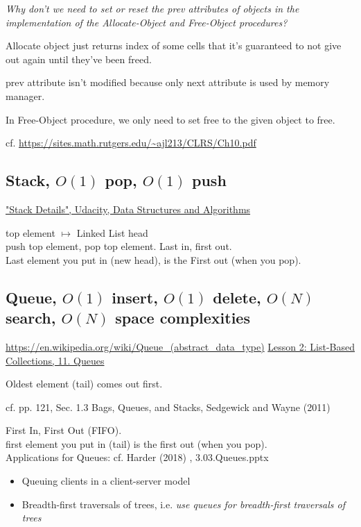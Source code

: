 \documentclass[10pt]{amsart}
\begin{document}
\begin{multicols*}{2}
\emph{Why don't we need to set or reset the prev attributes of objects in the implementation of the Allocate-Object and Free-Object procedures?}

Allocate object just returns index of some cells that it's guaranteed to not give out again until they've been freed. 

prev attribute isn't modified because only next attribute is used by memory manager.

In Free-Object procedure, we only need to set free to the given object to free.

cf. \url{https://sites.math.rutgers.edu/~ajl213/CLRS/Ch10.pdf}

\subsection{Stack, $O(1)$ pop, $O(1)$ push}

\href{https://classroom.udacity.com/courses/ud513/lessons/7117335401/concepts/71225347790923}{"Stack Details", Udacity, Data Structures and Algorithms}

top element $\mapsto $ Linked List head \\
push top element, pop top element.
Last in, first out. \\
Last element you put in (new head), is the First out (when you pop).

\subsection{Queue, $O(1)$ insert, $O(1)$ delete, $O(N)$ search, $O(N)$ space complexities}

\url{https://en.wikipedia.org/wiki/Queue_(abstract_data_type)}
\href{https://classroom.udacity.com/courses/ud513/lessons/7117335401/concepts/71222050580923}{Lesson 2: List-Based Collections, 11. Queues}

Oldest element (tail) comes out first.

cf. pp. 121, Sec. 1.3 Bags, Queues, and Stacks, Sedgewick and Wayne (2011) \cite{SeWa2011}

First In, First Out (FIFO). \\
first element you put in (tail) is the first out (when you pop). \\

Applications for Queues: cf. Harder (2018) \cite{Hard2018}, 3.03.Queues.pptx
\begin{itemize}
	\item Queuing clients in a client-server model
	\item Breadth-first traversals of trees, i.e. \emph{use queues for breadth-first traversals of trees}
\end{itemize}


\end{multicols*}
\end{document}
